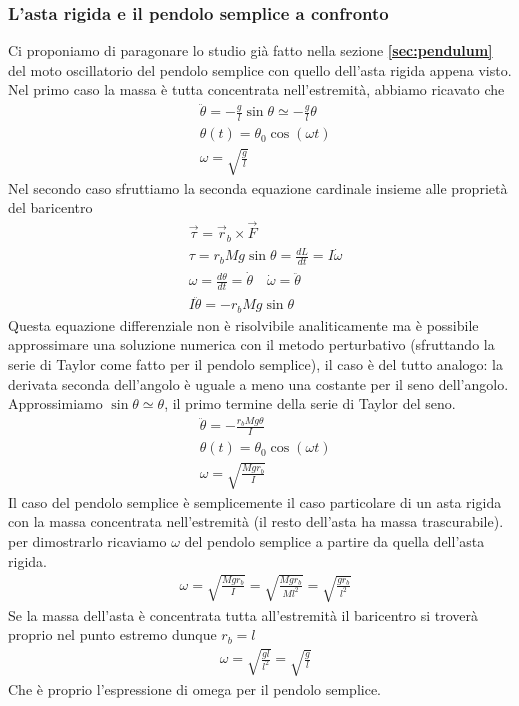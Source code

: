 \subsubsection{L'asta rigida e il pendolo semplice a confronto}
Ci proponiamo di paragonare lo studio già fatto nella sezione \textbf{\ref{sec:pendulum}} del moto oscillatorio del pendolo semplice con quello dell'asta rigida appena visto.\\
Nel primo caso la massa è tutta concentrata nell'estremità, abbiamo ricavato che 
\begin{align*}
	&\ddot{\theta} = -\frac{g}{l}\sin\theta \simeq -\frac{g}{l} \theta \\
	&\theta(t) = \theta_0 \cos(\omega t)\\
	&\omega = \sqrt{\frac{g}{l}}
\end{align*}
Nel secondo caso sfruttiamo la seconda equazione cardinale insieme alle proprietà del baricentro
\begin{align*}
	&\vec{\tau} = \vec{r}_b \times \vec{F}\\
	&\tau = r_b Mg \sin \theta = \frac{dL}{dt} = I \dot{\omega}\\
	&\omega = \frac{d \theta}{dt} = \dot{\theta} \quad \dot{\omega} = \ddot{\theta}\\
	& I\ddot{\theta} = -r_b Mg \sin\theta
\end{align*}
Questa equazione differenziale non è risolvibile analiticamente ma è possibile approssimare una soluzione numerica con il metodo perturbativo (sfruttando la serie di Taylor come fatto per il pendolo semplice), il caso è del tutto analogo: la derivata seconda dell'angolo è uguale a meno una costante per il seno dell'angolo. Approssimiamo $\sin\theta \simeq \theta$, il primo termine della serie di Taylor del seno. 
\begin{align*}
	&\ddot{\theta} = -\frac{r_b M g \theta}{I}\\
	&\theta(t) = \theta_0 \cos(\omega t)\\
	&\omega = \sqrt{\frac{M g r_b}{I}} 
\end{align*}
Il caso del pendolo semplice è semplicemente il caso particolare di un asta rigida con la massa concentrata nell'estremità (il resto dell'asta ha massa trascurabile). per dimostrarlo ricaviamo $\omega$ del pendolo semplice a partire da quella dell'asta rigida.
\begin{align*}
	&\omega = \sqrt{\frac{M g r_b}{I}} = \sqrt{\frac{M g r_b}{M l^2}} = \sqrt{\frac{g r_b}{l^2}}
\end{align*}
Se la massa dell'asta è concentrata tutta all'estremità il baricentro si troverà proprio nel punto estremo dunque $r_b = l$
\begin{align*}
	&\omega = \sqrt{\frac{g l}{l^2}} = \sqrt{\frac{g}{l}} 
\end{align*}
Che è proprio l'espressione di omega per il pendolo semplice.
